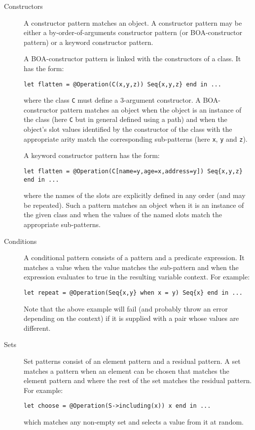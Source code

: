 \documentclass{article}
\begin{document}
\begin{description}
\item[Constructors]
A constructor pattern matches an object. A constructor pattern may be either a
by-order-of-arguments constructor pattern (or BOA-constructor pattern) or a 
keyword constructor pattern.

A BOA-constructor pattern is linked with the constructors of a class. It has the
form:
\begin{verbatim}
let flatten = @Operation(C(x,y,z)) Seq{x,y,z} end in ...
\end{verbatim}
where the class {\tt C} must define a 3-argument constructor. A BOA-constructor
pattern matches an object when the object is an instance of the class (here {\tt C} but
in general defined using a path) and when the object's slot values identified by the
constructor of the class with the appropriate arity match the corresponding
sub-patterns (here {\tt x}, {\tt y} and {\tt z}).

A keyword constructor pattern has the form:
\begin{verbatim}
let flatten = @Operation(C[name=y,age=x,address=y]) Seq{x,y,z} end in ...
\end{verbatim}
where the names of the slots are explicitly defined in any order (and may be repeated).
Such a pattern matches an object when it is an instance of the given class and when
the values of the named slots match the appropriate sub-patterns.

\item[Conditions]
A conditional pattern consists of a pattern and a predicate expression. It matches a
value when the value matches the sub-pattern and when the expression evaluates
to true in the resulting variable context. For example:
\begin{verbatim}
let repeat = @Operation(Seq{x,y} when x = y) Seq{x} end in ...
\end{verbatim}
Note that the above example will fail (and probably throw an error depending on the context)
if it is supplied with a pair whose values are different.

\item[Sets]
Set patterns consist of an element pattern and a residual pattern. A set matches a
pattern when an element can be chosen that matches the element pattern and where the
rest of the set matches the residual pattern. For example:
\begin{verbatim}
let choose = @Operation(S->including(x)) x end in ...
\end{verbatim}
which matches any non-empty set and selects a value from it at random. 


\end{description}
\end{document}
